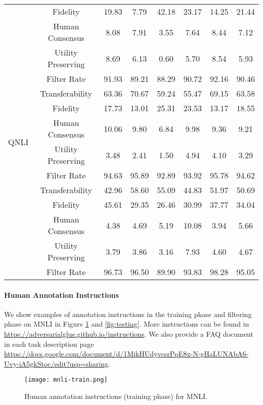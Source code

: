 \documentclass{article}
\begin{document}
\begin{table}[t]
{\begin{tabular}{cc|ccccc|c}
           & Fidelity & 19.83 & 7.79 & 42.18 & 23.17 & 14.25 & 21.44 \\
           & Human Consensus & 8.08 & 7.91 & 3.55 & 7.64 & 8.44 & 7.12 \\
           & Utility Preserving & 8.69 & 6.13 & 0.60 & 5.70 & 8.54 & 5.93 \\
           & Filter Rate & 91.93 & 89.21 & 88.29 & 90.72 & 92.16 & 90.46 \\
           \midrule
           \multirow{6}{*}{QNLI} & Transferability & 63.36 & 70.67 & 59.24 & 55.47 & 69.15 & 63.58 \\
           & Fidelity & 17.73 & 13.01 & 25.31 & 23.53 & 13.17 & 18.55 \\
           & Human Consensus & 10.06 & 9.80 & 6.84 & 9.98 & 9.36 & 9.21 \\
           & Utility Preserving & 3.48 & 2.41 & 1.50 & 4.94 & 4.10 & 3.29 \\
           & Filter Rate & 94.63 & 95.89 & 92.89 & 93.92 & 95.78 & 94.62 \\
           \midrule
           \multirow{6}{*}{QQP} & Transferability & 42.96 & 58.60 & 55.09 & 44.83 & 51.97 & 50.69 \\
           & Fidelity & 45.61 & 29.35 & 26.46 & 30.99 & 37.77 & 34.04 \\
           & Human Consensus & 4.38 & 4.69 & 5.19 & 10.08 & 3.94 & 5.66 \\
           & Utility Preserving & 3.79 & 3.86 & 3.16 & 7.93 & 4.60 & 4.67 \\
           & Filter Rate & 96.73 & 96.50 & 89.90 & 93.83 & 98.28 & 95.05 \\
           \bottomrule
    \end{tabular}
    }

\end{table}


\paragraph{Human Annotation Instructions} 
We show examples of annotation instructions in the training phase and filtering phase on MNLI in Figure \ref{fig:training} and \ref{fig:testing}. More instructions can be found in \url{https://adversarialglue.github.io/instructions}. We also provide a FAQ document in each task description page \url{https://docs.google.com/document/d/1MikHUdyvcsrPqE8x-N-gHaLUNAbA6-Uvy-iA5gkStoc/edit?usp=sharing}. 


\begin{figure}
    \centering
    \texttt{[image: mnli-train.png]}
    \caption{Human annotation instructions (training phase) for MNLI.}
    \label{fig:training}
\end{figure}
\end{document}

